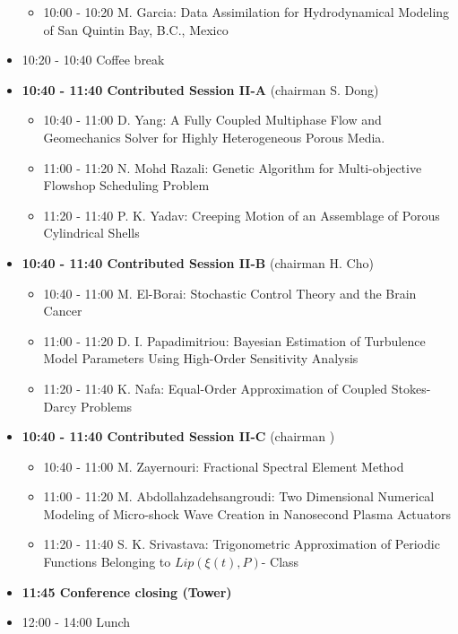 \documentclass[10pt, A4]{article}%
\begin{document}
\begin{itemize}
\begin{itemize}
    \item 10:00 - 10:20 {M. Garcia}: {Data Assimilation for Hydrodynamical Modeling of San Quintin Bay, B.C., Mexico}
  \end{itemize}
  \item 10:20 - 10:40 Coffee break
  \item {\bf 10:40 - 11:40 Contributed Session II-A} (chairman S. Dong) 
  \begin{itemize}
    \item 10:40 - 11:00 {D. Yang}: {A Fully Coupled Multiphase Flow and Geomechanics Solver for Highly Heterogeneous Porous Media.} %
    \item 11:00 - 11:20 {N. Mohd Razali}: {Genetic Algorithm for Multi-objective Flowshop Scheduling Problem} %
    \item 11:20 - 11:40 {P. K. Yadav}: {Creeping Motion of an Assemblage of Porous Cylindrical Shells}
  \end{itemize}
  \item {\bf 10:40 - 11:40 Contributed Session II-B} (chairman H. Cho) 
  \begin{itemize}
    \item 10:40 - 11:00 {M. El-Borai}: {Stochastic Control Theory and the Brain Cancer}   
    \item 11:00 - 11:20 {D. I. Papadimitriou}: {Bayesian Estimation of Turbulence Model Parameters Using High-Order Sensitivity Analysis}
    \item 11:20 - 11:40 {K. Nafa}: {Equal-Order Approximation of Coupled Stokes-Darcy Problems}
  \end{itemize}
  \item {\bf 10:40 - 11:40 Contributed Session II-C} (chairman ) 
  \begin{itemize}
    \item 10:40 - 11:00 {M. Zayernouri}: {Fractional Spectral Element Method}   
    \item 11:00 - 11:20 {M. Abdollahzadehsangroudi}: {Two Dimensional Numerical Modeling of Micro-shock Wave Creation in Nanosecond Plasma Actuators}
    \item 11:20 - 11:40 {S. K. Srivastava}: {Trigonometric Approximation of Periodic Functions Belonging to $Lip(\xi(t), P)$- Class}
  \end{itemize}
  \item {\bf 11:45 Conference closing (Tower)}
  \item 12:00 - 14:00 Lunch
\newpage
\end{itemize}
\end{document}
